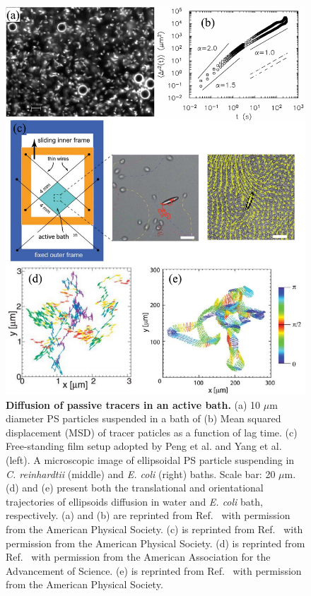 \begin{figure}[!htbp]
	\begin{center}
	\includegraphics[height=5 in]{Figs/1-Intro/3.pdf}
	\end{center}
	\caption[Diffusion of passive tracers in an active bath]
	{
	\textbf{Diffusion of passive tracers in an active bath.}
	(a) 10 $\mu$m diameter PS particles suspended in a bath of 
	(b) Mean squared displacement (MSD) of tracer paticles as a function of lag time.
	(c) Free-standing film setup adopted by Peng et al. and Yang et al. (left)\cite{Peng2016, Yang2016}. A microscopic image of ellipsoidal PS particle suspending in \textit{C. reinhardtii} (middle) and \textit{E. coli} (right) baths. Scale bar: 20 $\mu$m.
	(d) and (e) present both the translational and orientational trajectories of ellipsoids diffusion in water and \textit{E. coli} bath, respectively.
	(a) and (b) are reprinted from Ref.~\cite{Wu2000} with permission from the American Physical Society.
	(c) is reprinted from Ref.~\cite{Yang2016} with permission from the American Physical Society.
	(d) is reprinted from Ref.~\cite{Han2006} with permission from the American Association for the Advancement of Science.
	(e) is reprinted from Ref.~\cite{Peng2016} with permission from the American Physical Society.
	}
	\label{fig:diffusion-in-active-fluids}
\end{figure}


